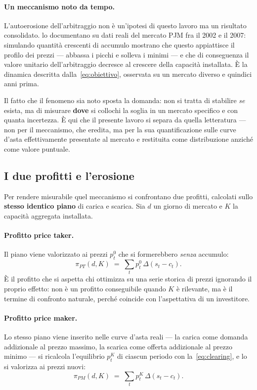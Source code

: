 \paragraph{Un meccanismo noto da tempo.} L'autoerosione dell'arbitraggio non \`e
un'ipotesi di questo lavoro ma un risultato consolidato.
\textcite{sioshansi2009storage} lo documentano su dati reali del mercato PJM fra il 2002
e il 2007: simulando quantit\`a crescenti di accumulo mostrano che questo appiattisce il
profilo dei prezzi — abbassa i picchi e solleva i minimi — e che di conseguenza il valore
unitario dell'arbitraggio decresce al crescere della capacit\`a installata. \`E la
dinamica descritta dalla~\eqref{eq:obiettivo}, osservata su un mercato diverso e quindici
anni prima.

Il fatto che il fenomeno sia noto sposta la domanda: non si tratta di stabilire \emph{se}
esista, ma di misurare \textbf{dove} si collochi la soglia in un mercato specifico e con
quanta incertezza. \`E qui che il presente lavoro si separa da quella letteratura — non
per il meccanismo, che eredita, ma per la sua quantificazione sulle curve d'asta
effettivamente presentate al mercato e restituita come distribuzione anzich\'e come
valore puntuale.

\subsection{I due profitti e l'erosione}
\label{sec:erosione}

Per rendere misurabile quel meccanismo si confrontano due profitti, calcolati sullo
\textbf{stesso identico piano} di carica e scarica. Sia $d$ un giorno di mercato e $K$ la
capacit\`a aggregata installata.

\paragraph{Profitto price taker.} Il piano viene valorizzato ai prezzi $p_t^{0}$ che si
formerebbero \emph{senza} accumulo:
\begin{equation}
\pi_{PT}(d,K) \;=\; \sum_{t} p^{0}_{t}\, \Delta \left(s_t - c_t\right).
\label{eq:pi-pt}
\end{equation}
\`E il profitto che si aspetta chi ottimizza su una serie storica di prezzi ignorando il
proprio effetto: non \`e un profitto conseguibile quando $K$ \`e rilevante, ma \`e il termine
di confronto naturale, perch\'e coincide con l'aspettativa di un investitore.

\paragraph{Profitto price maker.} Lo stesso piano viene inserito nelle curve d'asta reali —
la carica come domanda addizionale al prezzo massimo, la scarica come offerta addizionale al
prezzo minimo — si ricalcola l'equilibrio $p_t^{K}$ di ciascun periodo con
la~\eqref{eq:clearing}, e lo si valorizza ai prezzi nuovi:
\begin{equation}
\pi_{PM}(d,K) \;=\; \sum_{t} p^{K}_{t}\, \Delta \left(s_t - c_t\right).
\label{eq:pi-pm}
\end{equation}

